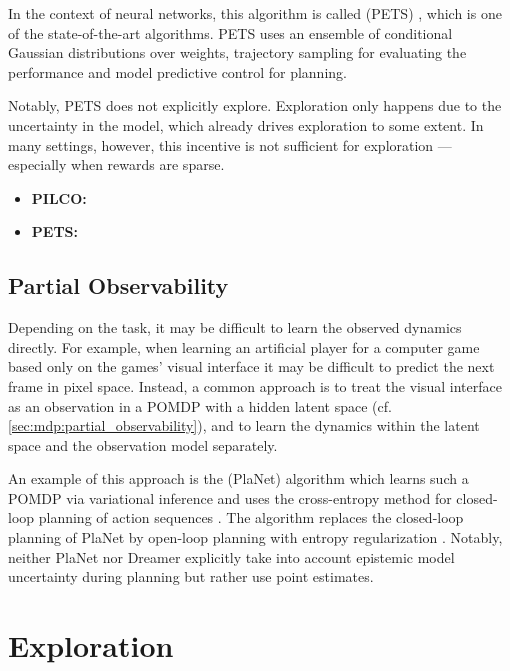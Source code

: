 In the context of neural networks, this algorithm is called  (PETS) \citep{chua2018deep}, which is one of the state-of-the-art algorithms.
PETS uses an ensemble of conditional Gaussian distributions over weights, trajectory sampling for evaluating the performance and model predictive control for planning.

Notably, PETS does not explicitly explore.
Exploration only happens due to the uncertainty in the model, which already drives exploration to some extent.
In many settings, however, this incentive is not sufficient for exploration --- especially when rewards are sparse.

\begin{oreadings}
  \begin{itemize}
    \item \textbf{PILCO:} 
    \item \textbf{PETS:} 
  \end{itemize}
\end{oreadings}

\subsection{Partial Observability}

Depending on the task, it may be difficult to learn the observed dynamics directly.
For example, when learning an artificial player for a computer game based only on the games' visual interface it may be difficult to predict the next frame in pixel space.
Instead, a common approach is to treat the visual interface as an observation in a POMDP with a hidden latent space (cf. \cref{sec:mdp:partial_observability}), and to learn the dynamics within the latent space and the observation model separately.

An example of this approach is the  (PlaNet) algorithm which learns such a POMDP via variational inference and uses the cross-entropy method for closed-loop planning of action sequences \citep{hafner2019learning}.
The  algorithm replaces the closed-loop planning of PlaNet by open-loop planning with entropy regularization \citep{hafner2019dream,hafner2020mastering}.
Notably, neither PlaNet nor Dreamer explicitly take into account epistemic model uncertainty during planning but rather use point estimates.

\section{Exploration}\label{sec:mbarl:exploration}%

